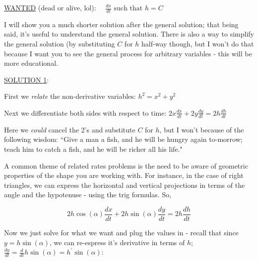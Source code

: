\documentclass{article}
\begin{document}
\vspace{10pt}

\underline{WANTED} (dead or alive, lol): $\quad\frac{dx}{dt}\mbox{ such that }h=C$

\vspace{10pt}

I will show you a much shorter solution after the general solution; that being said, it's useful to understand the general solution. There is also a way to simplify the general solution (by substituting $C$ for $h$ half-way though, but I won't do that because I want you to see the general process for arbitrary variables - this will be more educational.

\vspace{10pt}

\underline{SOLUTION 1}:

\vspace{10pt}

First we \textit{relate} the non-derivative variables: $h^2=x^2+y^2$

\vspace{10pt}

Next we differentiate both sides with respect to time: $2x\frac{dx}{dt}+2y\frac{dy}{dt}=2h\frac{dh}{dt}$

\vspace{10pt}

Here we \textit{could} cancel the 2's and substitute $C$ for $h$, but I won't because of the following wisdom: ``Give a man a fish, and he will be hungry again to-morrow; teach him to catch a fish, and he will be richer all his life."

\newpage

A common theme of related rates problems is the need to be aware of geometric properties of the shape you are working with. For instance, in the case of right triangles, we can express the horizontal and vertical projections in terms of the angle and the hypotenuse - using the trig formulas. So,

\[2h\cos(\alpha)\frac{dx}{dt}+2h\sin(\alpha)\frac{dy}{dt}=2h\frac{dh}{dt}\]

\vspace{10pt}

Now we just solve for what we want and plug the values in - recall that since $y=h\sin(\alpha)$, we can re-espress it's derivative in terms of $h$; $\frac{dy}{dt}=\frac{d}{dt}h\sin(\alpha)=h^\prime\sin(\alpha)$:

\vspace{10pt}
\end{document}
